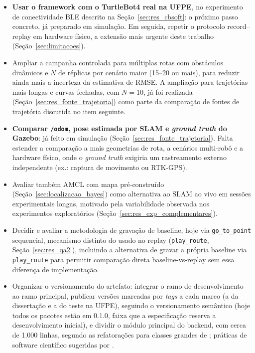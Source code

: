 \begin{itemize}
    \item \textbf{Usar o framework com o TurtleBot4 real na UFPE}, no
    experimento de conectividade BLE descrito na Seção~\ref{sec:res_cbsoft}:
    o próximo passo concreto, já preparado em simulação. Em seguida, repetir
    o protocolo record--replay em hardware físico, a extensão mais urgente
    deste trabalho (Seção~\ref{sec:limitacoes}).

    \item Ampliar a campanha controlada para múltiplas rotas com obstáculos
    dinâmicos e $N$ de réplicas por cenário maior (15--20 ou mais), para
    reduzir ainda mais a incerteza da estimativa de RMSE. A ampliação para
    trajetórias mais longas e curvas fechadas, com $N=10$, já foi realizada
    (Seção~\ref{sec:res_fonte_trajetoria}) como parte da comparação de
    fontes de trajetória discutida no item seguinte.

    \item \textbf{Comparar \texttt{/\allowbreak odom}, pose estimada por
    SLAM e \textit{ground truth} do Gazebo}: já feito em simulação
    (Seção~\ref{sec:res_fonte_trajetoria}). Falta estender a comparação a
    mais geometrias de rota, a cenários multi-robô e a hardware físico, onde
    o \textit{ground truth} exigiria um rastreamento externo independente
    (ex.: captura de movimento ou RTK-GPS).

    \item Avaliar também AMCL \cite{thrun2005} com mapa pré-construído
    (Seção~\ref{sec:localizacao_bayes}) como alternativa ao SLAM ao vivo em
    sessões experimentais longas, motivado pela variabilidade observada nos
    experimentos exploratórios (Seção~\ref{sec:res_exp_complementares}).

    \item Decidir e avaliar a metodologia de gravação de baseline, hoje
    via \texttt{go\_\allowbreak to\_\allowbreak point} sequencial, mecanismo
    distinto do usado no replay (\texttt{play\_\allowbreak route},
    Seção~\ref{sec:res_qa2}), incluindo a alternativa de gravar a própria
    baseline via \texttt{play\_\allowbreak route} para permitir comparação
    direta baseline-vs-replay sem essa diferença de implementação.

    \item Organizar o versionamento do artefato: integrar o ramo de
    desenvolvimento ao ramo principal, publicar versões marcadas por
    \textit{tags} a cada marco (a da dissertação e a do teste na UFPE),
    seguindo o versionamento semântico \cite{semver} (hoje todos os pacotes
    estão em 0.1.0, faixa que a especificação reserva a desenvolvimento
    inicial), e dividir o módulo principal do backend, com cerca de 1.000
    linhas, segundo as refatorações para classes grandes de
    ; práticas de software científico sugeridas por
    .


\end{itemize}
